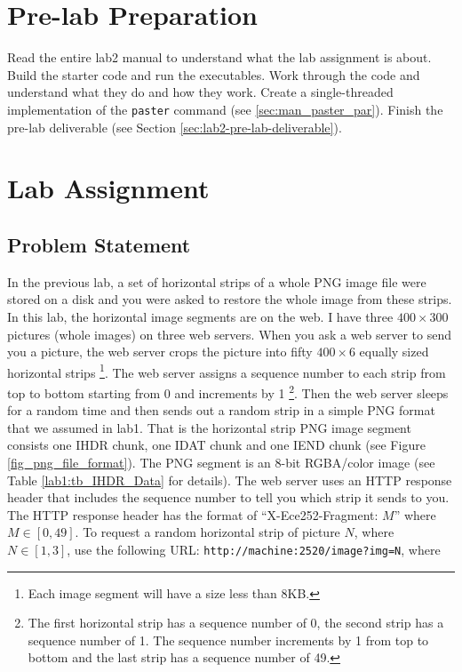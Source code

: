 \section{Pre-lab Preparation}
Read the entire lab2 manual to understand what the lab assignment is about. Build the starter code and run the executables. Work through the code and understand what they do and how they work. Create a single-threaded implementation of the \verb+paster+ command (see \ref{sec:man_paster_par}).
Finish the pre-lab deliverable (see Section \ref{sec:lab2-pre-lab-deliverable}).


\section{Lab Assignment}
\subsection{Problem Statement}
\label{sec:lab2_problem_statement}
In the previous lab, a set of horizontal strips of a whole PNG image file were stored on a disk and you were asked to restore the whole image from these strips. In this lab, the horizontal image segments are on the web. I have  three $400 \times 300$ pictures (whole images) on three web servers. When you ask a web server to send you a picture, the web server crops the picture into fifty
$400 \times 6$ equally sized horizontal strips
\footnote{Each image segment will have a size less than 8KB.}. The web server assigns a sequence number to each strip from top to bottom starting from 0 and increments by 1
\footnote{The first horizontal strip has a sequence number of 0, the second strip has a sequence number of 1. The sequence number increments by 1 from top to bottom and the last strip has a sequence number of 49.}. Then the web server sleeps for a random time and then sends out a random strip in a simple PNG format that we assumed in lab1. That is the horizontal strip PNG image segment consists one IHDR chunk, one IDAT chunk and one IEND chunk (see Figure \ref{fig_png_file_format}). The PNG segment is an 8-bit RGBA/color image (see Table \ref{lab1:tb_IHDR_Data} for details). The web server uses an HTTP response header that includes the sequence number to tell you which strip it sends to you. The HTTP response header has the format of ``X-Ece252-Fragment: $M$'' where $M \in [0, 49]$. To request a random horizontal strip of picture $N$, where $N\in[1,3]$, use the following URL:
\verb+http://machine:2520/image?img=N+, where

